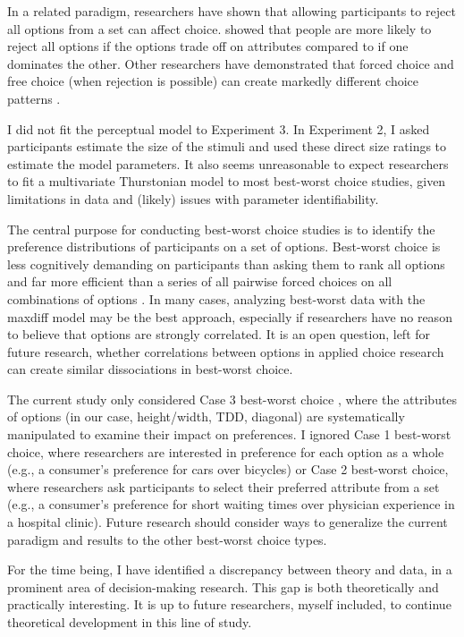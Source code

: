 In a related paradigm, researchers have shown that allowing participants to reject all options from a set can affect choice. \textcite{tverskyChoiceConflictDynamics1992a} showed that people are more likely to reject all options if the options trade off on attributes compared to if one dominates the other. Other researchers have demonstrated that forced choice and free choice (when rejection is possible) can create markedly different choice patterns \parencite{dhar1997consumer,dhar1997context,dhar1996effect,dharEffectForcedChoice2003b,noguchiDescriptionexperienceGapChoice2016a,brazellNochoiceOptionDual2006b,parker2011rejectable,chernevChoiceOverloadConceptual2015}. 

I did not fit the perceptual model to Experiment 3. In Experiment 2, I asked participants estimate the size of the stimuli and used these direct size ratings to estimate the model parameters. It also seems unreasonable to expect researchers to fit a multivariate Thurstonian model to most best-worst choice studies, given limitations in data and (likely) issues with parameter identifiability. 

The central purpose for conducting best-worst choice studies is to identify the preference distributions of participants on a set of options. Best-worst choice is less cognitively demanding on participants than asking them to rank all options and far more efficient than a series of all pairwise forced choices on all combinations of options \parencite{louviere2008modeling}. In many cases, analyzing best-worst data with the maxdiff model may be the best approach, especially if researchers have no reason to believe that options are strongly correlated. It is an open question, left for future research, whether correlations between options in applied choice research can create similar dissociations in best-worst choice. 

The current study only considered Case 3 best-worst choice \parencite{marleyModelsBestWorst2012}, where the attributes of options (in our case, height/width, TDD, diagonal) are systematically manipulated to examine their impact on preferences. I ignored Case 1 best-worst choice, where researchers are interested in preference for each option as a whole (e.g., a consumer's preference for cars over bicycles) or Case 2 best-worst choice, where researchers ask participants to select their preferred attribute from a set (e.g., a consumer's preference for short waiting times over physician experience in a hospital clinic). Future research should consider ways to generalize the current paradigm and results to the other best-worst choice types.

For the time being, I have identified a discrepancy between theory and data, in a prominent area of decision-making research. This gap is both theoretically and practically interesting. It is up to future researchers, myself included, to continue theoretical development in this line of study. 